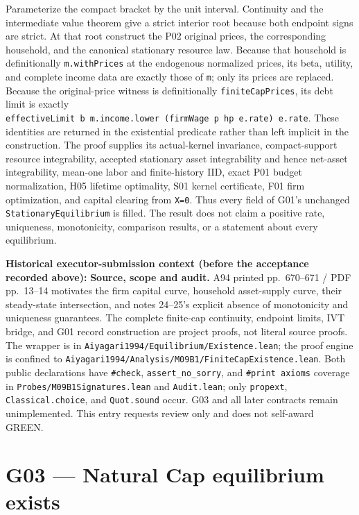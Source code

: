 \documentclass[
  11pt,
]{article}
\let\LedgerOriginalTexttt\texttt
\renewcommand{\texttt}[1]{{\small\LedgerOriginalTexttt{#1}}}
\begin{document}
Parameterize the compact bracket by the unit interval. Continuity and
the intermediate value theorem give a strict interior root because both
endpoint signs are strict. At that root construct the P02 original
prices, the corresponding household, and the canonical stationary
resource law. Because that household is definitionally
\texttt{m.withPrices} at the endogenous normalized prices, its beta,
utility, and complete income data are exactly those of \texttt{m}; only
its prices are replaced. Because the original-price witness is
definitionally \texttt{finiteCapPrices}, its debt limit is exactly
\texttt{effectiveLimit\ b\ m.income.lower\ (firmWage\ p\ hp\ e.rate)\ e.rate}.
These identities are returned in the existential predicate rather than
left implicit in the construction. The proof supplies its actual-kernel
invariance, compact-support resource integrability, accepted stationary
asset integrability and hence net-asset integrability, mean-one labor
and finite-history IID, exact P01 budget normalization, H05 lifetime
optimality, S01 kernel certificate, F01 firm optimization, and capital
clearing from \texttt{X=0}. Thus every field of G01's unchanged
\texttt{StationaryEquilibrium} is filled. The result does not claim a
positive rate, uniqueness, monotonicity, comparison results, or a
statement about every equilibrium.

\textbf{Historical executor-submission context (before the acceptance
recorded above):} \textbf{Source, scope and audit.} A94 printed
pp.~670--671 / PDF pp.~13--14 motivates the firm capital curve,
household asset-supply curve, their steady-state intersection, and notes
24--25's explicit absence of monotonicity and uniqueness guarantees. The
complete finite-cap continuity, endpoint limits, IVT bridge, and G01
record construction are project proofs, not literal source proofs. The
wrapper is in \texttt{Aiyagari1994/Equilibrium/Existence.lean}; the
proof engine is confined to
\texttt{Aiyagari1994/Analysis/M09B1/FiniteCapExistence.lean}. Both
public declarations have \texttt{\#check}, \texttt{assert\_no\_sorry},
and \texttt{\#print\ axioms} coverage in
\texttt{Probes/M09B1Signatures.lean} and \texttt{Audit.lean}; only
\texttt{propext}, \texttt{Classical.choice}, and \texttt{Quot.sound}
occur. G03 and all later contracts remain unimplemented. This entry
requests review only and does not self-award GREEN.

\section{G03 --- Natural Cap equilibrium
exists}\label{g03-natural-cap-equilibrium-exists}
\end{document}
